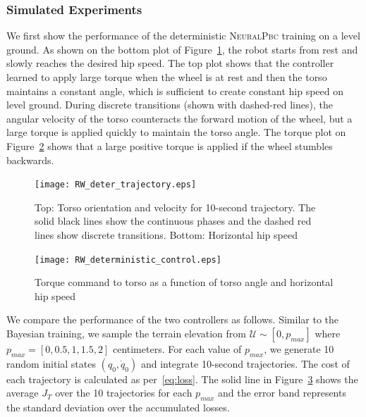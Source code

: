 \subsubsection{Simulated Experiments}

We first show the performance of the deterministic \textsc{NeuralPbc} training
on a level ground.
%
As shown on the bottom plot of Figure~\ref{fig:deter_rw_trajectory}, the robot
starts from rest and slowly reaches the desired hip speed.
%
The top plot shows that the controller learned to apply large torque
when the wheel is at rest and then the torso maintains a constant angle, which
is sufficient to create constant hip speed on level ground.  
%
During discrete transitions (shown with dashed-red lines), the angular velocity
of the torso counteracts the forward motion of the wheel, but a large torque is
applied quickly to maintain the torso angle.
%
The torque plot on Figure~\ref{fig:deter_control} shows that a large
positive torque is applied if the wheel stumbles backwards.
%

\begin{figure}[H]
    \centering
    \texttt{[image: RW\_deter\_trajectory.eps]}
    \caption{Top: Torso orientation and velocity for 10-second trajectory. The
            solid black lines show the continuous phases and the dashed red
            lines show discrete transitions. Bottom: Horizontal hip speed}
    \label{fig:deter_rw_trajectory}
\end{figure}

\begin{figure}[H]
    \centering
    \texttt{[image: RW\_deterministic\_control.eps]}
    \caption{Torque command to torso as a function of torso angle and horizontal hip speed}
    \label{fig:deter_control}
\end{figure}
We compare the performance of the two controllers as follows.
%
Similar to the Bayesian training, we sample the terrain elevation from
$\mathcal{U} \sim[0, p_{max}]$ where $p_{max} = [0, 0.5, 1, 1.5, 2]$ centimeters.
%
For each value of $p_{max}$, we generate 10 random initial states $(q_0,
\dot{q}_0)$ and integrate 10-second trajectories.
%
The cost of each trajectory is calculated as per~\eqref{eq:loss}.
%
The solid line in Figure~\ref{fig:comparison} shows the average $J_T$ over the
10 trajectories for each $p_{max}$ and the error band represents the standard
deviation over the accumulated losses.

\begin{figure}
    \label{fig:comparison}
\end{figure}

